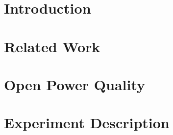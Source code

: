 \documentclass[11pt]{uhthesis}
\author{Sergey Negrashov}
\begin{document}
\maketitle

\begin{frontmatter}


\copyrightpage







\tableofcontents

\listoftables

\listoffigures

\end{frontmatter}

\chapter{Introduction}



\chapter{Related Work}



\chapter{Open Power Quality}


\chapter{Experiment Description}






  
\end{document}
